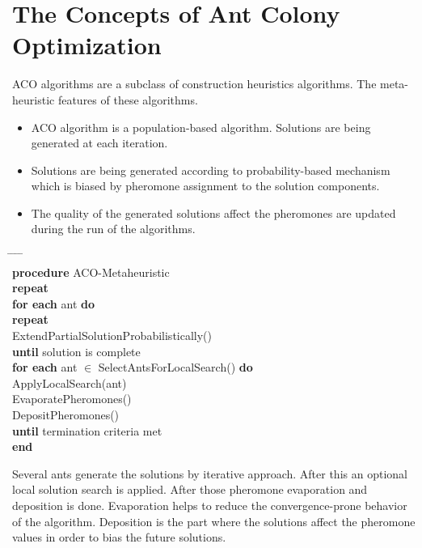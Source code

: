 \section{The Concepts of Ant Colony Optimization}

ACO algorithms are a subclass of construction heuristics algorithms. The meta-heuristic features of these algorithms.

\begin{itemize}
\item ACO algorithm is a population-based algorithm. Solutions are being generated at each iteration.
\item Solutions are being generated according to probability-based mechanism which is biased by pheromone assignment to the solution components.
\item The quality of the generated solutions affect the pheromones are updated during the run of the algorithms.
\end{itemize}

\begin{algorithm}
\begin{tabbing}
\hspace*{1cm} \= \hspace*{1cm} \= \hspace*{1cm} \= \hspace*{1cm} \= \hspace*{1cm} \= \\
\textbf{procedure} ACO-Metaheuristic \\
\> \textbf{repeat} \\
\> \> \textbf{for each} ant \textbf{do} \\
\> \> \> \textbf{repeat} \\
\> \> \> \> ExtendPartialSolutionProbabilistically() \\
\> \> \> \textbf{until} solution is complete \\
\> \> \textbf{for each} ant $\in$ SelectAntsForLocalSearch() \textbf{do} \\
\> \> \> ApplyLocalSearch(ant) \\
\> \> EvaporatePheromones() \\
\> \> DepositPheromones() \\
\> \textbf{until} termination criteria met \\
\textbf{end}
\end{tabbing}
\end{algorithm}

Several ants generate the solutions by iterative approach. After this an optional local solution search is applied. After those pheromone evaporation and deposition is done. Evaporation helps to reduce the convergence-prone behavior of the algorithm. Deposition is the part where the solutions affect the pheromone values in order to bias the future solutions.







